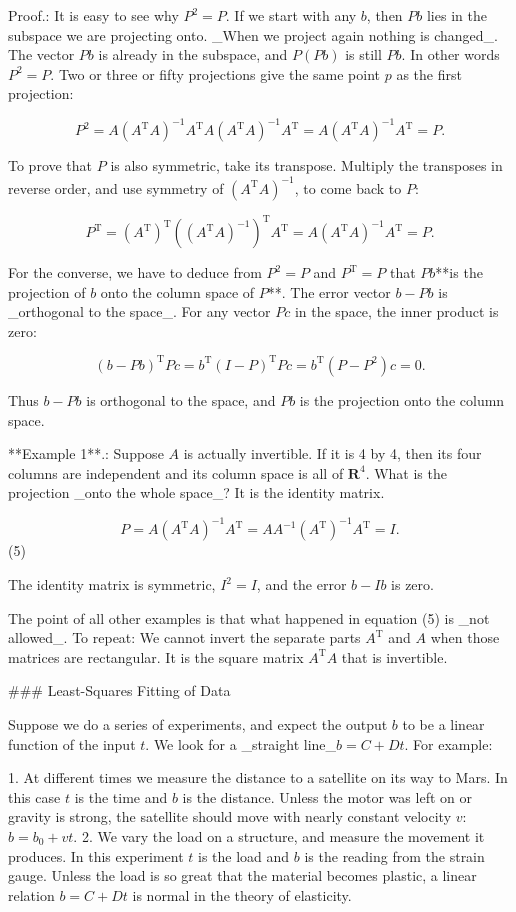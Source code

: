 Proof.: It is easy to see why \(P^{2}=P\). If we start with any \(b\), then \(Pb\) lies in the subspace we are projecting onto. _When we project again nothing is changed_. The vector \(Pb\) is already in the subspace, and \(P(Pb)\) is still \(Pb\). In other words \(P^{2}=P\). Two or three or fifty projections give the same point \(p\) as the first projection:

\[P^{2}=A(A^{\mathrm{T}}A)^{-1}A^{\mathrm{T}}A(A^{\mathrm{T}}A)^{-1}A^{\mathrm{T }}=A(A^{\mathrm{T}}A)^{-1}A^{\mathrm{T}}=P.\]

To prove that \(P\) is also symmetric, take its transpose. Multiply the transposes in reverse order, and use symmetry of \((A^{\mathrm{T}}A)^{-1}\), to come back to \(P\):

\[P^{\mathrm{T}}=(A^{\mathrm{T}})^{\mathrm{T}}\left((A^{\mathrm{T}}A)^{-1} \right)^{\mathrm{T}}A^{\mathrm{T}}=A(A^{\mathrm{T}}A)^{-1}A^{\mathrm{T}}=P.\]

For the converse, we have to deduce from \(P^{2}=P\) and \(P^{\mathrm{T}}=P\) that \(Pb\)**is the projection of \(b\) onto the column space of \(P\)**. The error vector \(b-Pb\) is _orthogonal to the space_. For any vector \(Pc\) in the space, the inner product is zero:

\[(b-Pb)^{\mathrm{T}}Pc=b^{\mathrm{T}}(I-P)^{\mathrm{T}}Pc=b^{\mathrm{T}}(P-P^{ 2})c=0.\]

Thus \(b-Pb\) is orthogonal to the space, and \(Pb\) is the projection onto the column space. 

**Example 1**.: Suppose \(A\) is actually invertible. If it is 4 by 4, then its four columns are independent and its column space is all of \(\mathbf{R}^{4}\). What is the projection _onto the whole space_? It is the identity matrix.

\[P=A(A^{\mathrm{T}}A)^{-1}A^{\mathrm{T}}=AA^{-1}(A^{\mathrm{T}})^{-1}A^{\mathrm{ T}}=I.\] (5)

The identity matrix is symmetric, \(I^{2}=I\), and the error \(b-Ib\) is zero.

The point of all other examples is that what happened in equation (5) is _not allowed_. To repeat: We cannot invert the separate parts \(A^{\mathrm{T}}\) and \(A\) when those matrices are rectangular. It is the square matrix \(A^{\mathrm{T}}A\) that is invertible.

### Least-Squares Fitting of Data

Suppose we do a series of experiments, and expect the output \(b\) to be a linear function of the input \(t\). We look for a _straight line_\(b=C+Dt\). For example:

1. At different times we measure the distance to a satellite on its way to Mars. In this case \(t\) is the time and \(b\) is the distance. Unless the motor was left on or gravity is strong, the satellite should move with nearly constant velocity \(v\): \(b=b_{0}+vt\).
2. We vary the load on a structure, and measure the movement it produces. In this experiment \(t\) is the load and \(b\) is the reading from the strain gauge. Unless the load is so great that the material becomes plastic, a linear relation \(b=C+Dt\) is normal in the theory of elasticity.

 